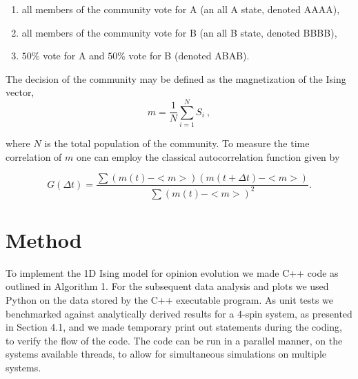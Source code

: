 \documentclass[a4paper]{article}
\begin{document}
\begin{enumerate}
    \item all members of the community vote for A (an all A state,  denoted AAAA),
    \item all members of the community vote for B (an all B state, denoted BBBB),
    \item $50\%$ vote for A and $50\%$ vote for B (denoted ABAB).
\end{enumerate}



The decision of the community may be defined as the magnetization of the Ising vector, 
\begin{equation}
    m = \frac{1}{N}\sum_{i=1}^{N}S_i \ ,
    \label{eq:mag}
\end{equation}

where $N$ is the total population of the community. To measure the time correlation of $m$ one can employ the classical autocorrelation function given by

\begin{equation}
G(\Delta t) = \frac
{\sum \left( m(t)-<m>\right) \left( m(t+ \Delta t)- <m>\right)}
{\sum (m(t)-<m>)^2}.
\label{eq:corr}
\end{equation}

\section{Method}
To implement the 1D Ising model for opinion evolution we made C++ code as outlined in Algorithm 1. For the subsequent data analysis and plots we used Python on the data stored by the C++ executable program. As unit tests we benchmarked against analytically derived results for a 4-spin system, as presented in Section 4.1, and we made temporary print out statements during the coding, to verify the flow of the code. The code can be run in a parallel manner, on the systems available threads, to allow for simultaneous simulations on multiple systems. 
\end{document}
